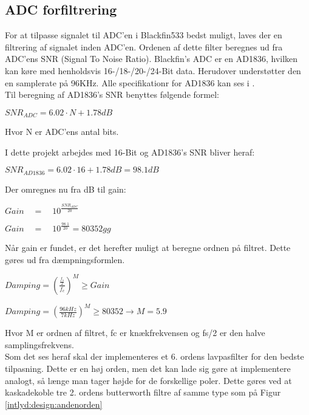 
\subsection{ADC forfiltrering}

For at tilpasse signalet til ADC'en i Blackfin533 bedst muligt, laves der en filtrering af signalet inden ADC'en. 
Ordenen af dette filter beregnes ud fra ADC'ens SNR (Signal To Noise Ratio). Blackfin's ADC er en AD1836, hvilken kan køre med henholdsvis 16-/18-/20-/24-Bit data. Herudover understøtter den en samplerate på 96KHz. Alle specifikationr for AD1836 kan ses i 
\citep{AD1836}. \\

Til beregning af AD1836's SNR benyttes følgende formel:
\begin{center}
${ SNR }_{ ADC }=6.02\cdot N+1.78dB$
\end{center}

Hvor N er ADC'ens antal bits. 

I dette projekt arbejdes med 16-Bit og AD1836's SNR bliver heraf: 
\begin{center}
${ SNR }_{ AD1836 }=6.02\cdot 16+1.78dB = 98.1dB$
\end{center}

Der omregnes nu fra dB til gain: 
\begin{center}
$Gain\quad =\quad { 10 }^{ \frac { { SNR }_{ ADC } }{ 20 }  }$

$Gain\quad =\quad { 10 }^{ \frac { 98.1 }{ 20 }  }=80352gg$
\end{center}

Når gain er fundet, er det herefter muligt at beregne ordnen på filtret. Dette gøres ud fra dæmpningsformlen. 
\begin{center}
$Damping={ \left( \frac { \frac { { f }_{ s } }{ 2 }  }{ { f }_{ c } }  \right)  }^{ M }\ge Gain$

$Damping={ \left( \frac { 96kHz }{ 7kHz }  \right)  }^{ M }\ge 80352\rightarrow M=5.9$
\end{center}

Hvor M er ordnen af filtret, fc er knækfrekvensen og fs/2 er den halve samplingsfrekvens.\\

Som det ses heraf skal der implementeres et 6. ordens lavpasfilter for den bedste tilpasning. Dette er en høj orden, men det kan lade sig gøre at implementere analogt, så længe man tager højde for de forskellige poler. 
Dette gøres ved at kaskadekoble tre 2. ordens butterworth filtre af samme type som på Figur \ref{intlyd:design:andenorden}

